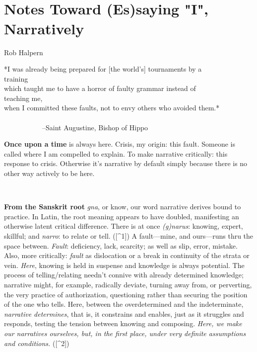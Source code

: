 ~

~

\hypertarget{notes-toward-essaying-i-narratively}{%
\section{Notes Toward (Es)saying "I",
Narratively}\label{notes-toward-essaying-i-narratively}}

Rob Halpern

*I was already being prepared for {[}the world's{]} tournaments by a\\
training\\
which taught me to have a horror of faulty grammar instead of\\
teaching me,\\
when I committed these faults, not to envy others who avoided them.*\\
~\\
\hspace*{0.333em} ~~~~~~~~~~~--Saint Augustine, Bishop of Hippo

\textbf{Once upon a time} is always here. Crisis, my origin: this fault.
Someone is called where I am compelled to explain. To make narrative
critically: this response to crisis. Otherwise it's narrative by default
simply because there is no other way actively to be here.

~

\textbf{From the Sanskrit root} \emph{gna}, or know, our word narrative
derives bound to practice. In Latin, the root meaning appears to have
doubled, manifesting an otherwise latent critical difference. There is
at once \emph{(g)narus}: knowing, expert, skillful; and \emph{narro}: to
relate or tell. ({[}\^{}1{]}) A fault---mine, and ours---runs thru the
space between. \emph{Fault}: deficiency, lack, scarcity; as well as
slip, error, mistake. Also, more critically: \emph{fault} as dislocation
or a break in continuity of the strata or vein. \emph{Here}, knowing is
held in suspense and knowledge is always potential. The process of
telling/relating needn't connive with already determined knowledge;
narrative might, for example, radically deviate, turning away from, or
perverting, the very practice of authorization, questioning rather than
securing the position of the one who tells. Here, between the
overdetermined and the indeterminate, \emph{narrative determines}, that
is, it constrains and enables, just as it struggles and responds,
testing the tension between knowing and composing. \emph{Here, we make
our narratives ourselves, but, in the first place, under very definite
assumptions and conditions.} ({[}\^{}2{]})

